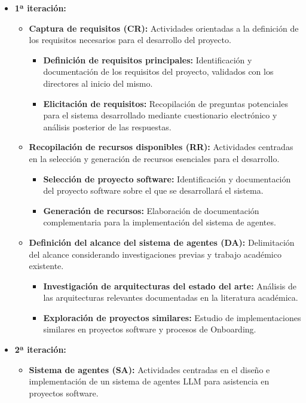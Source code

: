 \begin{itemize}
  \item\textbf{1ª iteración:}
    \begin{itemize}
      \item\textbf{Captura de requisitos (CR):} Actividades orientadas a la definición de los requisitos necesarios para el desarrollo del proyecto.
            \begin{itemize}
          \item\textbf{Definición de requisitos principales:} Identificación y documentación de los requisitos del proyecto, validados con los directores al inicio del mismo.
          \item\textbf{Elicitación de requisitos:} Recopilación de preguntas potenciales para el sistema desarrollado mediante cuestionario electrónico y análisis posterior de las respuestas.
        \end{itemize}
      \item\textbf{Recopilación de recursos disponibles (RR):} Actividades centradas en la selección y generación de recursos esenciales para el desarrollo.
        \begin{itemize}
          \item\textbf{Selección de proyecto software:} Identificación y documentación del proyecto software sobre el que se desarrollará el sistema.
          \item\textbf{Generación de recursos:} Elaboración de documentación complementaria para la implementación del sistema de agentes.
        \end{itemize}
      \item\textbf{Definición del alcance del sistema de agentes (DA):} Delimitación del alcance considerando investigaciones previas y trabajo académico existente.
    \begin{itemize}
          \item\textbf{Investigación de arquitecturas del estado del arte:} Análisis de las arquitecturas relevantes documentadas en la literatura académica.
          \item\textbf{Exploración de proyectos similares:} Estudio de implementaciones similares en proyectos software y procesos de Onboarding.
    \end{itemize}
      \end{itemize}
  \item\textbf{2ª iteración:}
    \begin{itemize}
      \item\textbf{Sistema de agentes (SA):} Actividades centradas en el diseño e implementación de un sistema de agentes LLM para asistencia en proyectos software.

\end{itemize}
\end{itemize}
